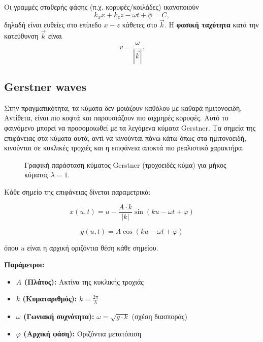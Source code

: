 \documentclass[a4paper, 11pt]{article}
\providecommand{\tightlist}{\setlength{\itemsep}{0pt}\setlength{\parskip}{0pt}}
\begin{document}
Οι γραμμές σταθερής φάσης (π.χ. κορυφές/κοιλάδες) ικανοποιούν \[
k_x x + k_z z - \omega t + \phi = C,
\] δηλαδή είναι ευθείες στο επίπεδο \(x\!-\!z\) κάθετες στο \(\vec{k}\).
Η \textbf{φασική ταχύτητα} κατά την κατεύθυνση \(\vec{k}\) είναι \[
v=\frac{\omega}{|\vec{k}|}.
\]

\subsection{Gerstner waves}\label{gerstner-waves}

Στην πραγματικότητα, τα κύματα δεν μοιάζουν καθόλου με καθαρά
ημιτονοειδή. Αντίθετα, είναι πιο κοφτά και παρουσιάζουν πιο αιχμηρές
κορυφές. Αυτό το φαινόμενο μπορεί να προσομοιωθεί με τα λεγόμενα κύματα
Gerstner. Τα σημεία της επιφάνειας στα κύματα αυτά, αντί να κινούνται
πάνω κάτω όπως στα ημιτονοειδή, κινούνται σε κυκλικές τροχιές και η
επιφάνεια αποκτά πιο ρεαλιστικό χαρακτήρα.

\begin{figure}[htbp]
\centering
{}
\caption{Γραφική παράσταση κύματος Gerstner (τροχοειδές κύμα) για μήκος κύματος $\lambda = 1$.}
\label{fig:gerstner}
\end{figure}

Κάθε σημείο της επιφάνειας δίνεται παραμετρικά:

\[x(u, t) = u - \frac{A \cdot k}{|k|} \sin(k u - \omega t + \varphi)\]

\[y(u, t) = A \cos(k u - \omega t + \varphi)\]

όπου \(u\) είναι η αρχική οριζόντια θέση κάθε σημείου.

\textbf{Παράμετροι:}

\begin{itemize}
\tightlist
\item
  \textbf{\(A\) (Πλάτος):} Ακτίνα της κυκλικής τροχιάς
\item
  \textbf{\(k\) (Κυματαριθμός):} \(k = \frac{2\pi}{\lambda}\)
\item
  \textbf{\(\omega\) (Γωνιακή συχνότητα):} \(\omega = \sqrt{g \cdot k}\)
  (σχέση διασποράς)
\item
  \textbf{\(\varphi\) (Αρχική φάση):} Οριζόντια μετατόπιση
\end{itemize}
\end{document}

